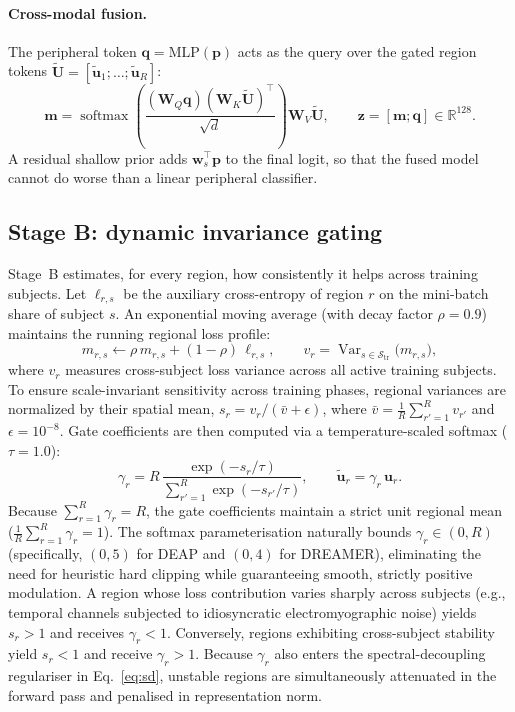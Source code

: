 \documentclass[a4paper,fleqn]{cas-sc}
\DeclareMathOperator{\softmax}{softmax}
\DeclareMathOperator{\Var}{Var}
\begin{document}
\paragraph{Cross-modal fusion.}
The peripheral token $\mathbf{q}=\mathrm{MLP}(\mathbf{p})$ acts as the query over the gated region tokens $\tilde{\mathbf{U}}=[\tilde{\mathbf{u}}_1;\dots;\tilde{\mathbf{u}}_R]$:
\begin{equation}
\mathbf{m}=\softmax\!\left(\frac{(\mathbf{W}_Q\mathbf{q})(\mathbf{W}_K\tilde{\mathbf{U}})^{\top}}{\sqrt{d}}\right)\mathbf{W}_V\tilde{\mathbf{U}},\qquad
\mathbf{z}=[\mathbf{m};\mathbf{q}]\in\mathbb{R}^{128}.
\end{equation}
A residual shallow prior adds $\mathbf{w}_s^{\top}\mathbf{p}$ to the final logit, so that the fused model cannot do worse than a linear peripheral classifier.

\subsection{Stage B: dynamic invariance gating}
Stage~B estimates, for every region, how consistently it helps across training subjects. Let $\ell_{r,s}$ be the auxiliary cross-entropy of region $r$ on the mini-batch share of subject $s$. An exponential moving average (with decay factor $\rho = 0.9$) maintains the running regional loss profile:
\begin{equation}
m_{r,s}\leftarrow\rho\,m_{r,s}+(1-\rho)\,\ell_{r,s},\qquad
v_r=\Var_{s\in\mathcal{S}_{\mathrm{tr}}}\bigl(m_{r,s}\bigr),
\end{equation}
where $v_r$ measures cross-subject loss variance across all active training subjects. To ensure scale-invariant sensitivity across training phases, regional variances are normalized by their spatial mean, $s_r = v_r / (\bar{v} + \epsilon)$, where $\bar{v} = \frac{1}{R}\sum_{r'=1}^{R} v_{r'}$ and $\epsilon = 10^{-8}$. Gate coefficients are then computed via a temperature-scaled softmax ($\tau = 1.0$):
\begin{equation}
\gamma_r=R\,\frac{\exp(-s_r / \tau)}{\sum_{r'=1}^{R}\exp(-s_{r'} / \tau)},\qquad \tilde{\mathbf{u}}_r=\gamma_r\,\mathbf{u}_r .
\label{eq:gate}
\end{equation}
Because $\sum_{r=1}^{R} \gamma_r = R$, the gate coefficients maintain a strict unit regional mean ($\frac{1}{R}\sum_{r=1}^{R}\gamma_r = 1$). The softmax parameterisation naturally bounds $\gamma_r \in (0, R)$ (specifically, $(0, 5)$ for DEAP and $(0, 4)$ for DREAMER), eliminating the need for heuristic hard clipping while guaranteeing smooth, strictly positive modulation. A region whose loss contribution varies sharply across subjects (e.g., temporal channels subjected to idiosyncratic electromyographic noise) yields $s_r > 1$ and receives $\gamma_r < 1$. Conversely, regions exhibiting cross-subject stability yield $s_r < 1$ and receive $\gamma_r > 1$. Because $\gamma_r$ also enters the spectral-decoupling regulariser in Eq.~\eqref{eq:sd}, unstable regions are simultaneously attenuated in the forward pass and penalised in representation norm.
\end{document}
